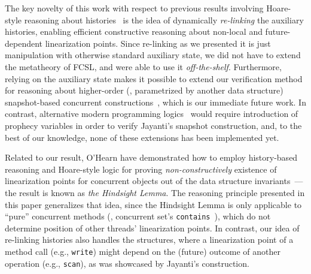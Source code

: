 The key novelty of this work with respect to previous results
involving Hoare-style reasoning about histories~\cite{Fu-al:CONCUR10,
  Gotsman-al:ESOP13,Bell-al:SAS10,Sergey-al:ESOP15,Hemed-al:DISC15} is
the idea of dynamically \emph{re-linking} the auxiliary histories,
enabling efficient constructive reasoning about non-local and
future-dependent linearization points.
%
Since re-linking as we presented it is just manipulation with
otherwise standard auxiliary state, we did not have to extend the
metatheory of FCSL, and were able to use it
\emph{off-the-shelf}. Furthermore, relying on the auxiliary state
makes it possible to extend our verification method for reasoning
about higher-order (\ie, parametrized by another data structure)
snapshot-based concurrent constructions~\cite{Petrank-Timnat:DISC13},
which is our immediate future work.
%
In contrast, alternative modern programming
logics~\cite{ArrozPincho-al:ECOOP14,Jung-al:POPL15,Svendsen-Birkedal:ESOP14}
would require introduction of prophecy variables in order to verify
Jayanti's snapshot construction, and, to the best of our knowledge,
none of these extensions has been implemented yet.

Related to our result, O'Hearn \etal have demonstrated how to employ
history-based reasoning and Hoare-style logic for proving
\emph{non-constructively} existence of linearization points for
concurrent objects out of the data structure
invariants~\cite{OHearn-al:PODC10}---the result is known as \emph{the
  Hindsight Lemma}. The reasoning principle presented in this paper
generalizes that idea, since the Hindsight Lemma is only applicable to
``pure'' concurrent methods (\eg, concurrent set's
\texttt{contains}~\cite{Heller-al:OPODIS05}), which do not determine
position of other threads' linearization points. In contrast, our idea
of re-linking histories also handles the structures, where a
linearization point of a method call (e.g., \texttt{write}) might
depend on the (future) outcome of another operation (e.g.,
\texttt{scan}), as was showcased by Jayanti's construction.




